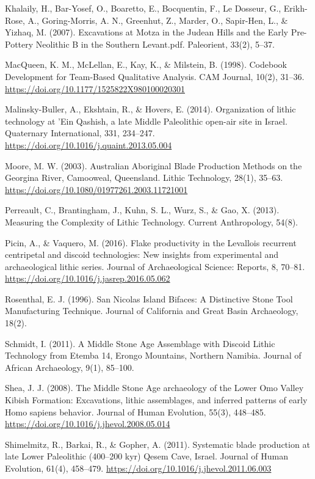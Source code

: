 \documentclass[
]{article}
\begin{document}
Khalaily, H., Bar-Yosef, O., Boaretto, E., Bocquentin, F., Le Dosseur,
G., Erikh-Rose, A., Goring-Morris, A. N., Greenhut, Z., Marder, O.,
Sapir-Hen, L., \& Yizhaq, M. (2007). Excavations at Motza in the Judean
Hills and the Early Pre-Pottery Neolithic B in the Southern Levant.pdf.
Paleorient, 33(2), 5--37.

MacQueen, K. M., McLellan, E., Kay, K., \& Milstein, B. (1998). Codebook
Development for Team-Based Qualitative Analysis. CAM Journal, 10(2),
31--36. \url{https://doi.org/10.1177/1525822X980100020301}

Malinsky-Buller, A., Ekshtain, R., \& Hovers, E. (2014). Organization of
lithic technology at 'Ein Qashish, a late Middle Paleolithic open-air
site in Israel. Quaternary International, 331, 234--247.
\url{https://doi.org/10.1016/j.quaint.2013.05.004}

Moore, M. W. (2003). Australian Aboriginal Blade Production Methods on
the Georgina River, Camooweal, Queensland. Lithic Technology, 28(1),
35--63. \url{https://doi.org/10.1080/01977261.2003.11721001}

Perreault, C., Brantingham, J., Kuhn, S. L., Wurz, S., \& Gao, X.
(2013). Measuring the Complexity of Lithic Technology. Current
Anthropology, 54(8).

Picin, A., \& Vaquero, M. (2016). Flake productivity in the Levallois
recurrent centripetal and discoid technologies: New insights from
experimental and archaeological lithic series. Journal of Archaeological
Science: Reports, 8, 70--81.
\url{https://doi.org/10.1016/j.jasrep.2016.05.062}

Rosenthal, E. J. (1996). San Nicolas Island Bifaces: A Distinctive Stone
Tool Manufacturing Technique. Journal of California and Great Basin
Archaeology, 18(2).

Schmidt, I. (2011). A Middle Stone Age Assemblage with Discoid Lithic
Technology from Etemba 14, Erongo Mountains, Northern Namibia. Journal
of African Archaeology, 9(1), 85--100.

Shea, J. J. (2008). The Middle Stone Age archaeology of the Lower Omo
Valley Kibish Formation: Excavations, lithic assemblages, and inferred
patterns of early Homo sapiens behavior. Journal of Human Evolution,
55(3), 448--485. \url{https://doi.org/10.1016/j.jhevol.2008.05.014}

Shimelmitz, R., Barkai, R., \& Gopher, A. (2011). Systematic blade
production at late Lower Paleolithic (400--200 kyr) Qesem Cave, Israel.
Journal of Human Evolution, 61(4), 458--479.
\url{https://doi.org/10.1016/j.jhevol.2011.06.003}
\end{document}
